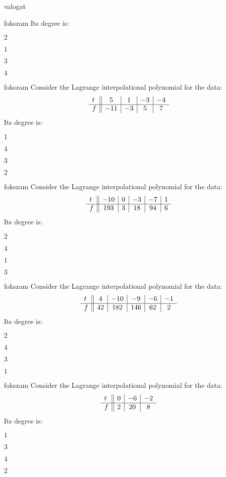 \documentclass[12pt]{article}
\begin{document}
\begin{quiz}{valogat}
\begin{multi}{fokszam}
Its degree is:
\item* $ 2 $
\item  $ 1 $
\item  $ 3 $
\item  $ 4 $
\end{multi}
\begin{multi}{fokszam}
Consider the Lagrange interpolational polynomial for the data:
$$\begin{array}{l ||c|c|c|c}t&5&1&-3&-4\\ \hline f&-11&-3&5&7 \\ \end{array}$$
Its degree is:
\item* $ 1 $
\item  $ 4 $
\item  $ 3 $
\item  $ 2 $
\end{multi}
\begin{multi}{fokszam}
Consider the Lagrange interpolational polynomial for the data:
$$\begin{array}{l ||c|c|c|c|c}t&-10&0&-3&-7&1\\ \hline f&193&3&18&94&6 \\ \end{array}$$
Its degree is:
\item* $ 2 $
\item  $ 4 $
\item  $ 1 $
\item  $ 3 $
\end{multi}
\begin{multi}{fokszam}
Consider the Lagrange interpolational polynomial for the data:
$$\begin{array}{l ||c|c|c|c|c}t&4&-10&-9&-6&-1\\ \hline f&42&182&146&62&2 \\ \end{array}$$
Its degree is:
\item* $ 2 $
\item  $ 4 $
\item  $ 3 $
\item  $ 1 $
\end{multi}
\begin{multi}{fokszam}
Consider the Lagrange interpolational polynomial for the data:
$$\begin{array}{l ||c|c|c}t&0&-6&-2\\ \hline f&2&20&8 \\ \end{array}$$
Its degree is:
\item* $ 1 $
\item  $ 3 $
\item  $ 4 $
\item  $ 2 $
\end{multi}
\end{quiz}
\end{document}

